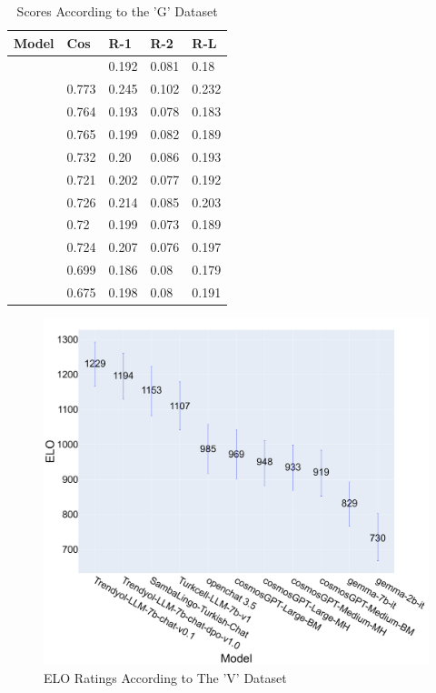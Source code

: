 \documentclass[conference]{IEEEtran}
\begin{document}
\begin{table}[htbp]
\caption{Scores According to the 'G' Dataset}
\begin{center}
\begin{tabular}{|p{2.5cm}|p{0.5cm}|p{0.5cm}|p{0.5cm}|p{0.5cm}|}
\hline
\centering \textbf{Model} & \textbf{Cos} & \textbf{R-1} & \textbf{R-2} & \textbf{R-L} \\
\hline
\centering{Turkcell-LLM-7b-v1} & \centering{0.766} & 0.192 & 0.081 & 0.18 \\
\hline
\centering{Trendyol-LLM-7b-chat-dpo-v1.0} & 0.773 & 0.245 & 0.102 & 0.232 \\
\hline
\centering{Trendyol-LLM-7b-chat-v0.1} & 0.764 & 0.193 & 0.078 & 0.183  \\
\hline
\centering{SambaLingo-Turkish-Chat} & 0.765 & 0.199 & 0.082 & 0.189  \\
\hline
\centering{openchat\_3.5} & 0.732 & 0.20 & 0.086 & 0.193 \\
\hline
\centering{cosmosGPT-Medium-MH} & 0.721 & 0.202 & 0.077 & 0.192 \\
\hline
\centering{cosmosGPT-Medium-BM} & 0.726 & 0.214 & 0.085 & 0.203 \\
\hline
\centering{cosmosGPT-Large-MH} & 0.72 & 0.199 & 0.073 & 0.189 \\
\hline
\centering{cosmosGPT-Large-BM} & 0.724 & 0.207 & 0.076 & 0.197 \\
\hline
\centering{gemma-7b-it} & 0.699 & 0.186 & 0.08 & 0.179 \\
\hline
\centering{gemma-2b-it} & 0.675 & 0.198 & 0.08 & 0.191  \\
\hline
\end{tabular}
\label{1kmodeller}
\end{center}
\end{table}

\begin{figure}[htbp] %
\centerline{\includegraphics[scale=0.045]{elo_ratings_diger_modeller.png}}
\caption{ELO Ratings According to The 'V' Dataset}
\label{elo_ratings_diger_modeller}
\end{figure}
\end{document}
